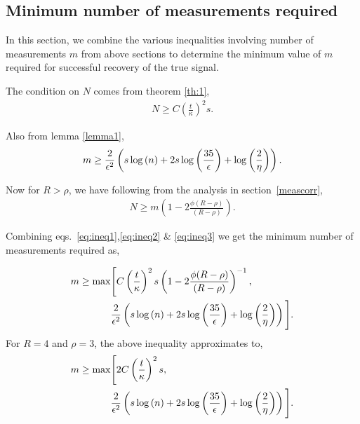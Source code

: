 \subsection{Minimum number of measurements required}
In this section, we combine the various inequalities involving number of measurements $m$ from above sections to determine the minimum value of $m$ required for successful recovery of the true signal.

The condition on $N$ comes from theorem \ref{th:1},
\begin{align}
N \geq C\left(\frac{t}{\kappa}\right)^2s.
\label{eq:ineq1}
\end{align}

Also from lemma \ref{lemma1},
\begin{align}
m \geq \frac{2}{\eps^2}\left(s\log{(n)} + 2s\log{\left(\frac{35}{\eps}\right)}+\log{\left(\frac{2}{\eta}\right)}\right).
\label{eq:ineq2}
\end{align}

Now for $R> \rho$, we have following from the analysis in section~\ref{meascorr},
\begin{align}
N \geq m \left(1-2\frac{\phi(R-\rho)}{(R-\rho)} \right).
\label{eq:ineq3}
\end{align}

Combining eqs.~\ref{eq:ineq1},\ref{eq:ineq2} \& \ref{eq:ineq3} we get the minimum number of measurements required as,

\begin{align}
m \geq \max & \Bigg[ C\left(\frac{t}{\kappa}\right)^2s \left(1-2\frac{\phi(R-\rho)}{(R-\rho)} \right)^{-1}, \nonumber \\ 
& \frac{2}{\eps^2}\left(s\log{(n)} + 2s\log{\left(\frac{35}{\eps}\right)}+\log{\left(\frac{2}{\eta}\right)}\right)\Bigg].
\label{eq:ineq4}
\end{align}
For $R=4$ and $\rho =3$, the above inequality approximates to,
\begin{align*}
m \geq \max & \Bigg[ 2C\left(\frac{t}{\kappa}\right)^2s, \nonumber \\ 
& \frac{2}{\epsilon^2}\left(s\log{(n)} + 2s\log{\left(\frac{35}{\epsilon}\right)}+\log{\left(\frac{2}{\eta}\right)}\right)\Bigg].
\end{align*}
